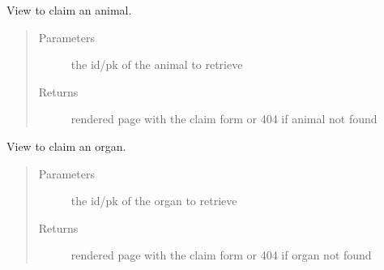 \documentclass[letterpaper,10pt,openany,oneside,english]{sphinxmanual}
\begin{document}
\begin{fulllineitems}
\label{\detokenize{index:animals.views.claim}}
View to claim an animal.
\begin{quote}\begin{description}
\item[{Parameters}] \leavevmode
{} \textendash{} the id/pk of the animal to retrieve

\item[{Returns}] \leavevmode
rendered page with the claim form
or 404 if animal not found

\end{description}\end{quote}

\end{fulllineitems}


\begin{fulllineitems}
\label{\detokenize{index:animals.views.claim_organ}}
View to claim an organ.
\begin{quote}\begin{description}
\item[{Parameters}] \leavevmode
{} \textendash{} the id/pk of the organ to retrieve

\item[{Returns}] \leavevmode
rendered page with the claim form
or 404 if organ not found

\end{description}\end{quote}

\end{fulllineitems}

\end{document}
